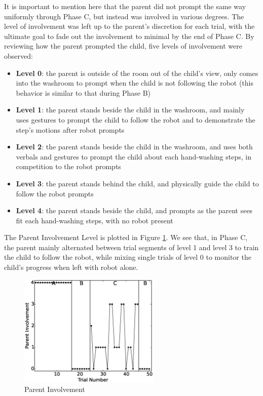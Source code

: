 It is important to mention here that the parent did not prompt the same way uniformly through Phase C, but instead was involved in various degrees.  The level of involvement was left up to the parent's discretion for each trial, with the ultimate goal to fade out the involvement to minimal by the end of Phase C.  By reviewing how the parent prompted the child, five levels of involvement were observed:
\begin{itemize}
	\item \textbf{Level 0}: the parent is outside of the room out of the child's view, only comes into the washroom to prompt when the child is not following the robot (this behavior is similar to that during Phase B)
	\item \textbf{Level 1}: the parent stands beside the child in the washroom, and mainly uses gestures to prompt the child to follow the robot and to demonstrate the step's motions after robot prompts
	\item \textbf{Level 2}: the parent stands beside the child in the washroom, and uses both verbals and gestures to prompt the child about each hand-washing steps, in competition to the robot prompts
	\item \textbf{Level 3}: the parent stands behind the child, and physically guide the child to follow the robot prompts
	\item \textbf{Level 4}: the parent stands beside the child, and prompts as the parent sees fit each hand-washing steps, with no robot present
\end{itemize}
The Parent Involvement Level is plotted in Figure \ref{fig:107ParentInvolvement}.  We see that, in Phase C, the parent mainly alternated between trial segments of level 1 and level 3 to train the child to follow the robot, while mixing single trials of level 0 to monitor the child's progress when left with robot alone.
\begin{figure} [h]
	\centering
	\includegraphics[width=0.6\textwidth]{./img/data_analysis/107ParentInvolvement.eps}
	\caption{Parent Involvement}
	\label{fig:107ParentInvolvement}
\end{figure}

